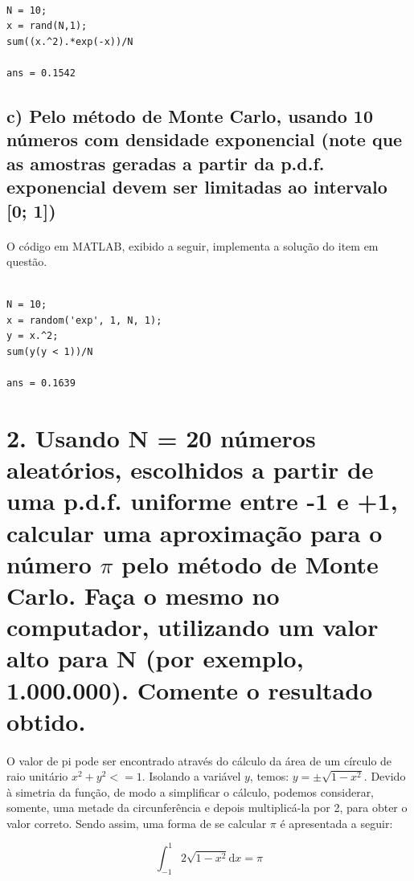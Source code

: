 \documentclass{report}
\begin{document}
\begin{verbatim}

N = 10; 
x = rand(N,1); 
sum((x.^2).*exp(-x))/N

ans = 0.1542

\end{verbatim}

\subsection*{c) Pelo método de Monte Carlo, usando 10 números com densidade exponencial (note que as amostras geradas a partir da p.d.f. exponencial devem ser limitadas ao intervalo [0; 1])}

\paragraph{} O código em MATLAB, exibido a seguir, implementa a solução do item em questão.

\begin{verbatim}

N = 10; 
x = random('exp', 1, N, 1); 
y = x.^2; 
sum(y(y < 1))/N

ans = 0.1639

\end{verbatim}

\section*{2. Usando N = 20 números aleatórios, escolhidos a partir de uma p.d.f. uniforme entre -1 e +1, calcular uma aproximação para o número $\pi$ pelo método de Monte Carlo. Faça o mesmo no computador, utilizando um valor alto para N (por exemplo, 1.000.000). Comente o resultado obtido.}

\paragraph{} O valor de pi pode ser encontrado através do cálculo da área de um círculo de raio unitário $x^2 + y^2 <= 1$. Isolando a variável $y$, temos: $y = \pm \sqrt{1 - x^2}$. Devido à simetria da função, de modo a simplificar o cálculo, podemos considerar, somente, uma metade da circunferência e depois multiplicá-la por 2, para obter o valor correto. Sendo assim, uma forma de se calcular $\pi$ é apresentada a seguir:

\begin{equation}\label{eq:pi}
\int_{-1}^{1} \! 2\sqrt{1-x^2}\mathrm{d}x = \pi
\end{equation}
\end{document}
